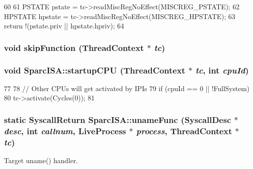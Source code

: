 \begin{DoxyCode}
60 {
61     PSTATE pstate = tc->readMiscRegNoEffect(MISCREG_PSTATE);
62     HPSTATE hpstate = tc->readMiscRegNoEffect(MISCREG_HPSTATE);
63     return !(pstate.priv || hpstate.hpriv);
64 }
\end{DoxyCode}
\hypertarget{namespaceSparcISA_a2624d7d8bac3eb03de2eb6e83903c208}{
\subsubsection[{skipFunction}]{\setlength{\rightskip}{0pt plus 5cm}void skipFunction ({\bf ThreadContext} $\ast$ {\em tc})}}
\label{namespaceSparcISA_a2624d7d8bac3eb03de2eb6e83903c208}
\hypertarget{namespaceSparcISA_a2f2a8ef3b49a1c14f0ee1e3f902528ec}{
\subsubsection[{startupCPU}]{\setlength{\rightskip}{0pt plus 5cm}void SparcISA::startupCPU ({\bf ThreadContext} $\ast$ {\em tc}, \/  int {\em cpuId})}}
\label{namespaceSparcISA_a2f2a8ef3b49a1c14f0ee1e3f902528ec}



\begin{DoxyCode}
77 {
78     // Other CPUs will get activated by IPIs
79     if (cpuId == 0 || !FullSystem)
80         tc->activate(Cycles(0));
81 }
\end{DoxyCode}
\hypertarget{namespaceSparcISA_ad0d0a68cadef3306ab1b1eba0af16e7c}{
\subsubsection[{unameFunc}]{\setlength{\rightskip}{0pt plus 5cm}static {\bf SyscallReturn} SparcISA::unameFunc ({\bf SyscallDesc} $\ast$ {\em desc}, \/  int {\em callnum}, \/  {\bf LiveProcess} $\ast$ {\em process}, \/  {\bf ThreadContext} $\ast$ {\em tc})}}
\label{namespaceSparcISA_ad0d0a68cadef3306ab1b1eba0af16e7c}


Target uname() handler. 


